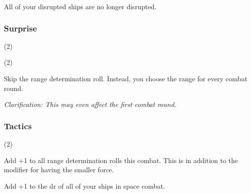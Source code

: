 All of your disrupted ships are no longer disrupted.

\subsubsection{Surprise} (2)

 (2)

Skip the range determination roll. Instead, you choose the range for every combat round.

\textit{Clarification: This may even affect the first combat round.}

\subsubsection{Tactics} (2)


Add +1 to all range determination rolls this combat. This is in addition to the modifier for having the smaller force.

Add +1 to the dr of all of your ships in space combat.